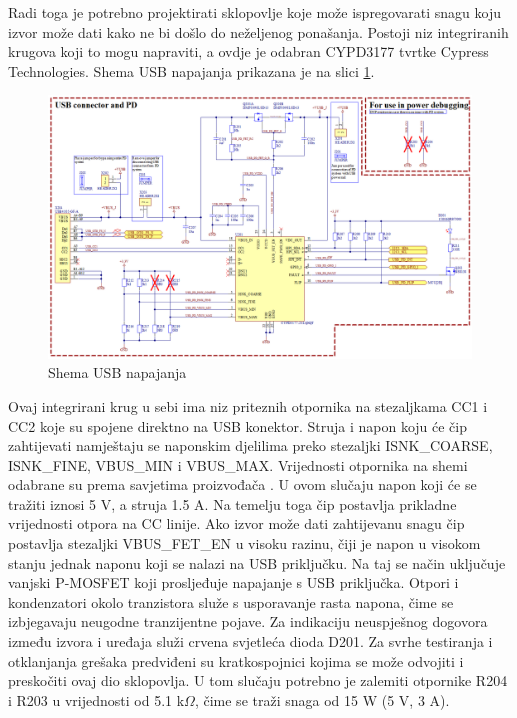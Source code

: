 Radi toga je potrebno projektirati sklopovlje koje može ispregovarati snagu koju izvor može dati kako ne bi došlo do neželjenog ponašanja. Postoji niz integriranih krugova koji to mogu napraviti, a ovdje je odabran CYPD3177 tvrtke Cypress Technologies. Shema USB napajanja prikazana je na slici \ref{slk:MB_USB}.
\begin{figure}
    \centering
    \includegraphics[width=1\textwidth]{Figures/MB_USB.png}
    \caption{Shema USB napajanja}
    \label{slk:MB_USB}
\end{figure}
Ovaj integrirani krug u sebi ima niz priteznih otpornika na stezaljkama CC1 i CC2 koje su spojene direktno na USB konektor. Struja i napon koju će čip zahtijevati namještaju se naponskim djelilima preko stezaljki ISNK\_COARSE, ISNK\_FINE, VBUS\_MIN i VBUS\_MAX. Vrijednosti otpornika na shemi odabrane su prema savjetima proizvođača \cite{ct:usb}. U ovom slučaju napon koji će se tražiti iznosi 5 V, a struja 1.5 A. Na temelju toga čip postavlja prikladne vrijednosti otpora na CC linije. Ako izvor može dati zahtijevanu snagu čip postavlja stezaljki VBUS\_FET\_EN u visoku razinu, čiji je napon u visokom stanju jednak naponu koji se nalazi na USB priključku. Na taj se način uključuje vanjski P-MOSFET koji prosljeđuje napajanje s USB priključka. Otpori i kondenzatori okolo tranzistora služe s usporavanje rasta napona, čime se izbjegavaju neugodne tranzijentne pojave. Za indikaciju neuspješnog dogovora između izvora i uređaja služi crvena svjetleća dioda D201. Za svrhe testiranja i otklanjanja grešaka predviđeni su kratkospojnici kojima se može odvojiti i preskočiti ovaj dio sklopovlja. U tom slučaju potrebno je zalemiti otpornike R204 i R203 u vrijednosti od 5.1 k$\Omega$, čime se traži snaga od 15 W (5 V, 3 A).

